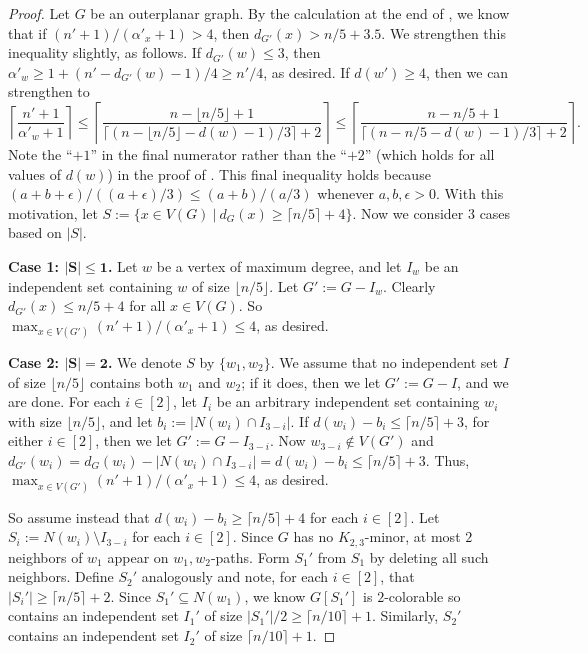 \documentclass[10pt,a4paper]{amsart}
\newcommand\ceil[1]{\lceil#1\rceil}
\newcommand\floor[1]{\lfloor#1\rfloor}
\renewcommand\ge\geqslant
\renewcommand\le\leqslant
\begin{document}
\begin{proof} 
Let $G$ be an outerplanar graph. 
	By the calculation at the end of , we know that if $(n'+1)/(\alpha'_x+1)>4$, then $d_{G'}(x) > n/5+3.5$. 
	We strengthen this inequality slightly, as follows.  If $d_{G'}(w)\le 3$, then $\alpha'_w\ge 1 + (n'-d_{G'}(w)-1)/4 \ge n'/4$, as desired.
	If $d(w') \ge 4$, then we can strengthen to
	$$
	\left\lceil\frac{n'+1}{\alpha'_w+1}\right\rceil 
	\le \left\lceil\frac{n-\floor{n/5}+1}{\ceil{(n-\floor{n/5}-d(w)-1)/3}+2}\right\rceil
	\le \left\lceil\frac{n-{n/5}+1}{\ceil{(n-{n/5}-d(w)-1)/3}+2}\right\rceil.
	$$
	Note the ``$+1$'' in the final numerator rather than the ``$+2$'' (which holds for all values of $d(w)$) in the proof of .
	This final inequality holds because $(a+b+\epsilon)/((a+\epsilon)/3) \le (a+b)/(a/3)$ whenever $a,b,\epsilon > 0$.
	With this motivation, let $S:=\{x\in V(G)~|~d_G(x) \ge \ceil{n/5} + 4\}$.  Now we consider $3$ cases based on $|S|$.

\textbf{Case 1: $\bm{|S|\le 1}$.}
Let $w$ be a vertex of maximum degree, and let $I_w$ be an independent set containing $w$ of size $\floor{n/5}$.
Let $G':= G-I_w$.  Clearly $d_{G'}(x)\le n/5+4$ for all $x\in V(G)$.  So $\max_{x\in V(G')}(n'+1)/(\alpha'_x+1)\le 4$, as desired.  

\textbf{Case 2: $\bm{|S|=2}$.}
We denote $S$ by $\{w_1,w_2\}$.  We assume that no independent set $I$ of size $\floor{n/5}$ contains both $w_1$ and $w_2$;
if it does, then we let $G':=G-I$, and we are done.
For each $i\in [2]$, let $I_i$ be an arbitrary independent set containing $w_i$ with size $\floor{n/5}$, and
let $b_i:=|N(w_i)\cap I_{3-i}|$.
If $d(w_i)-b_i\le \ceil{n/5}+3$, for either $i\in [2]$, then we let $G':=G-I_{3-i}$.
Now $w_{3-i}\notin V(G')$ and $d_{G'}(w_i) = d_G(w_i)-|N(w_i)\cap I_{3-i}| = d(w_i) - b_i \le \ceil{n/5}+3$.
Thus, $\max_{x\in V(G')}(n'+1)/(\alpha'_x+1)\le 4$, as desired.  

So assume instead that $d(w_i)-b_i \ge \ceil{n/5}+4$ for each $i\in [2]$.
Let $S_i:=N(w_i)\setminus I_{3-i}$ for each $i\in [2]$.  Since $G$ has no $K_{2,3}$-minor, at most $2$ neighbors of $w_1$ appear on $w_1,w_2$-paths.
Form $S_1'$ from $S_1$ by deleting all such neighbors.  Define $S_2'$ analogously and note, for each $i\in[2]$, that $|S_i'|\ge \ceil{n/5}+2$.
Since $S_1'\subseteq N(w_1)$, we know $G[S_1']$ is $2$-colorable so contains an independent set $I_1'$ of size $|S_1'|/2\ge \ceil{n/10}+1$.
Similarly, $S_2'$ contains an independent set $I_2'$ of size $\ceil{n/10}+1$.  


\end{proof}
\end{document}
